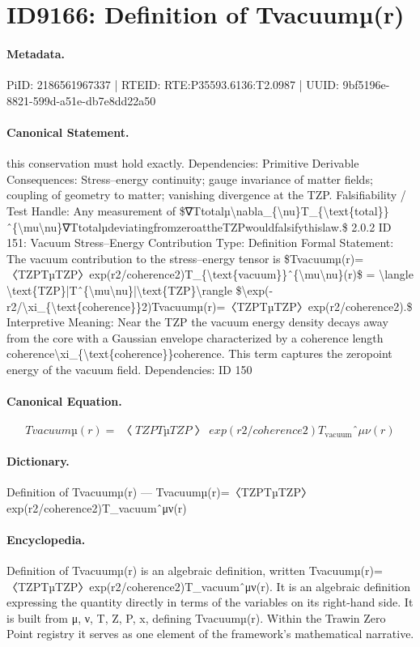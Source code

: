 \section*{ID9166: Definition of Tvacuumµ(r)}
\paragraph{Metadata.}
PiID: 2186561967337 | RTEID: RTE:P35593.6136:T2.0987 | UUID: 9bf5196e-8821-599d-a51e-db7e8dd22a50

\paragraph{Canonical Statement.}
this conservation must hold exactly. Dependencies: Primitive Derivable Consequences: Stress–energy continuity; gauge invariance of matter fields; coupling of geometry to matter; vanishing divergence at the TZP. Falsifiability / Test Handle: Any measurement of \$∇Ttotalµ\textbackslash{}nabla\_\{\textbackslash{}nu\}T\_\{\textbackslash{}text\{total\}\}ˆ\{\textbackslash{}mu\textbackslash{}nu\}∇TtotalµdeviatingfromzeroattheTZPwouldfalsifythislaw.\$ 2.0.2 ID 151: Vacuum Stress–Energy Contribution Type: Definition Formal Statement: The vacuum contribution to the stress–energy tensor is \$Tvacuumµ(r)=〈TZPTµTZP〉exp(r2/coherence2)T\_\{\textbackslash{}text\{vacuum\}\}ˆ\{\textbackslash{}mu\textbackslash{}nu\}(r)\$ = \textbackslash{}langle \textbackslash{}text\{TZP\}|Tˆ\{\textbackslash{}mu\textbackslash{}nu\}|\textbackslash{}text\{TZP\}\textbackslash{}rangle \$\textbackslash{}exp(-r2/\textbackslash{}xi\_\{\textbackslash{}text\{coherence\}\}2)Tvacuumµ(r)=〈TZPTµTZP〉exp(r2/coherence2).\$ Interpretive Meaning: Near the TZP the vacuum energy density decays away from the core with a Gaussian envelope characterized by a coherence length coherence\textbackslash{}xi\_\{\textbackslash{}text\{coherence\}\}coherence. This term captures the zeropoint energy of the vacuum field. Dependencies: ID 150

\paragraph{Canonical Equation.}
\[
Tvacuumµ(r)=〈TZPTµTZP〉exp(r2/coherence2)T_{\text{vacuum}}ˆ{\mu\nu}(r)
\]

\paragraph{Dictionary.}
Definition of Tvacuumµ(r) — Tvacuumµ(r)=〈TZPTµTZP〉exp(r2/coherence2)T\_vacuumˆμν(r)

\paragraph{Encyclopedia.}
Definition of Tvacuumµ(r) is an algebraic definition, written Tvacuumµ(r)=〈TZPTµTZP〉exp(r2/coherence2)T\_vacuumˆμν(r). It is an algebraic definition expressing the quantity directly in terms of the variables on its right-hand side. It is built from μ, ν, T, Z, P, x, defining Tvacuumµ(r). Within the Trawin Zero Point registry it serves as one element of the framework's mathematical narrative.
